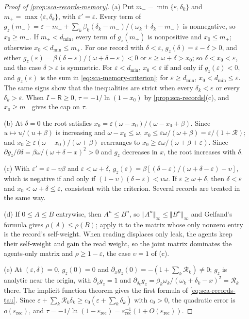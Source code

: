 \begin{proof}[Proof of \cref{prop:sca-records-memory}]
(a) Put $m_-=\min\{\varepsilon,\delta_k\}$ and $m_+=\max\{\varepsilon,\delta_k\}$, with $\varepsilon'=\varepsilon$. Every term of $g_z(m_-)=\varepsilon-m_-+\sum_k\beta_k(\delta_k-m_-)/(\omega_k+\delta_k-m_-)$ is nonnegative, so $x_0\ge m_-$. If $m_+<d_{\min}$, every term of $g_z(m_+)$ is nonpositive and $x_0\le m_+$; otherwise $x_0<d_{\min}\le m_+$. For one record with $\delta<\varepsilon$, $g_z(\delta)=\varepsilon-\delta>0$, and either $g_z(\varepsilon)=\beta(\delta-\varepsilon)/(\omega+\delta-\varepsilon)<0$ or $\varepsilon\ge\omega+\delta>x_0$; so $\delta<x_0<\varepsilon$, and the case $\delta>\varepsilon$ is symmetric. For $\varepsilon<d_{\min}$, $x_0<\varepsilon$ if and only if $g_z(\varepsilon)<0$, and $g_z(\varepsilon)$ is the sum in \eqref{eq:sca-memory-criterion}; for $\varepsilon\ge d_{\min}$, $x_0<d_{\min}\le\varepsilon$. The same signs show that the inequalities are strict when every $\delta_k<\varepsilon$ or every $\delta_k>\varepsilon$. When $I-\mathsf R\ge0$, $\tau=-1/\ln(1-x_0)$ by \cref{prop:sca-records}(c), and $x_0\ge m_-$ gives the cap on $\tau$.

(b) At $\delta=0$ the root satisfies $x_0=\varepsilon(\omega-x_0)/(\omega-x_0+\beta)$. Since $u\mapsto u/(u+\beta)$ is increasing and $\omega-x_0\le\omega$, $x_0\le\varepsilon\omega/(\omega+\beta)=\varepsilon/(1+\mathcal R)$; and $x_0\ge\varepsilon(\omega-x_0)/(\omega+\beta)$ rearranges to $x_0\ge\varepsilon\omega/(\omega+\beta+\varepsilon)$. Since $\partial g_z/\partial\delta=\beta\omega/(\omega+\delta-x)^2>0$ and $g_z$ decreases in $x$, the root increases with $\delta$.

(c) With $\varepsilon'=\varepsilon-\upsilon\beta$ and $\varepsilon<\omega+\delta$, $g_z(\varepsilon)=\beta[(\delta-\varepsilon)/(\omega+\delta-\varepsilon)-\upsilon]$, which is negative if and only if $(1-\upsilon)(\delta-\varepsilon)<\upsilon\omega$. If $\varepsilon\ge\omega+\delta$, then $\delta<\varepsilon$ and $x_0<\omega+\delta\le\varepsilon$, consistent with the criterion. Several records are treated in the same way.

(d) If $0\le A\le B$ entrywise, then $A^n\le B^n$, so $\Vert A^n\Vert_\infty\le\Vert B^n\Vert_\infty$ and Gelfand's formula gives $\rho(A)\le\rho(B)$; apply it to the matrix whose only nonzero entry is the record's self-weight. When reading displaces only leak, the agents keep their self-weight and gain the read weight, so the joint matrix dominates the agents-only matrix and $\rho\ge1-\varepsilon$, the case $\upsilon=1$ of (c).

(e) At $(\varepsilon,\delta)=0$, $g_z(0)=0$ and $\partial_xg_z(0)=-(1+\sum_k\mathcal R_k)\neq0$; $g_z$ is analytic near the origin, with $\partial_\varepsilon g_z=1$ and $\partial_{\delta_k}g_z=\beta_k\omega_k/(\omega_k+\delta_k-x)^2=\mathcal R_k$ there. The implicit function theorem gives the first formula of \eqref{eq:sca-records-tau}. Since $\varepsilon+\sum_k\mathcal R_k\delta_k\ge c_0(\varepsilon+\sum_k\delta_k)$ with $c_0>0$, the quadratic error is $o(\varepsilon_{\mathrm{rec}})$, and $\tau=-1/\ln(1-\varepsilon_{\mathrm{rec}})=\varepsilon_{\mathrm{rec}}^{-1}(1+O(\varepsilon_{\mathrm{rec}}))$.
\end{proof}

